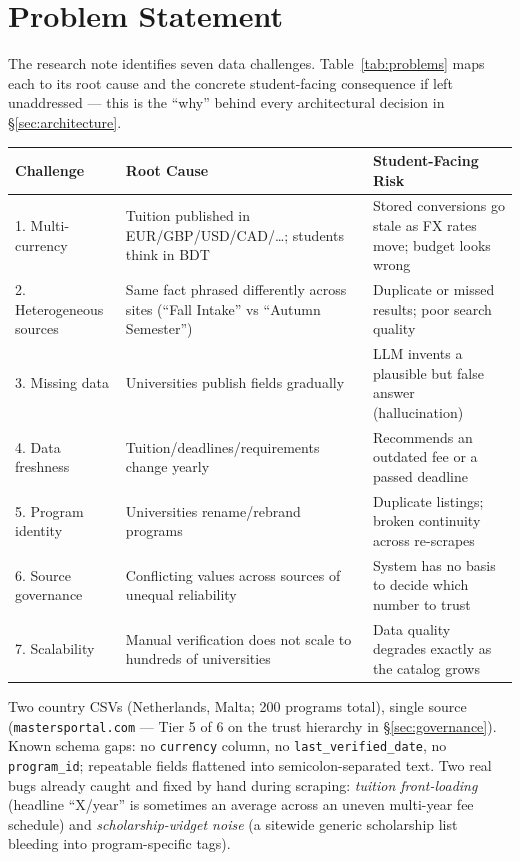 \documentclass[11pt,a4paper]{article}
\begin{document}
\section{Problem Statement}

The research note identifies seven data challenges. Table~\ref{tab:problems} maps each to its root cause and the concrete student-facing consequence if left unaddressed --- this is the ``why'' behind every architectural decision in \S\ref{sec:architecture}.

\begingroup
\renewcommand{\arraystretch}{1.35}
\begin{center}
\small
\begin{tabular}{@{}p{3.1cm}p{4.7cm}p{5.6cm}@{}}
\toprule
\textbf{Challenge} & \textbf{Root Cause} & \textbf{Student-Facing Risk} \\
\midrule
1. Multi-currency & Tuition published in EUR/GBP/USD/CAD/\dots; students think in BDT & Stored conversions go stale as FX rates move; budget looks wrong \\
2. Heterogeneous sources & Same fact phrased differently across sites (``Fall Intake'' vs ``Autumn Semester'') & Duplicate or missed results; poor search quality \\
3. Missing data & Universities publish fields gradually & LLM invents a plausible but false answer (hallucination) \\
4. Data freshness & Tuition/deadlines/requirements change yearly & Recommends an outdated fee or a passed deadline \\
5. Program identity & Universities rename/rebrand programs & Duplicate listings; broken continuity across re-scrapes \\
6. Source governance & Conflicting values across sources of unequal reliability & System has no basis to decide which number to trust \\
7. Scalability & Manual verification does not scale to hundreds of universities & Data quality degrades exactly as the catalog grows \\
\bottomrule
\end{tabular}
\label{tab:problems}
\end{center}
\endgroup

\begin{infobox}
Two country CSVs (Netherlands, Malta; 200 programs total), single source (\texttt{mastersportal.com} --- Tier 5 of 6 on the trust hierarchy in \S\ref{sec:governance}). Known schema gaps: no \texttt{currency} column, no \texttt{last\_verified\_date}, no \texttt{program\_id}; repeatable fields flattened into semicolon-separated text. Two real bugs already caught and fixed by hand during scraping: \emph{tuition front-loading} (headline ``\texteuro X/year'' is sometimes an average across an uneven multi-year fee schedule) and \emph{scholarship-widget noise} (a sitewide generic scholarship list bleeding into program-specific tags).
\end{infobox}
\end{document}
